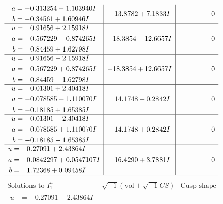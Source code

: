 \documentclass[1p]{elsarticle_modified}
\theoremstyle{definition}
\newcommand{\I}{\sqrt{-1}}
\begin{document}
$$\begin{array}{c|c|c}
\begin{aligned}
a &= -0.313254 - 1.103940 I \\
b &= -0.34561 + 1.60946 I\end{aligned}
 & \phantom{-}13.8782 + 7.1833 I & \phantom{-0.000000 } 0 \\ \hline\begin{aligned}
u &= \phantom{-}0.91656 + 2.15918 I \\
a &= \phantom{-}0.567229 - 0.874265 I \\
b &= \phantom{-}0.84459 + 1.62798 I\end{aligned}
 & -18.3854 - 12.6657 I & \phantom{-0.000000 } 0 \\ \hline\begin{aligned}
u &= \phantom{-}0.91656 - 2.15918 I \\
a &= \phantom{-}0.567229 + 0.874265 I \\
b &= \phantom{-}0.84459 - 1.62798 I\end{aligned}
 & -18.3854 + 12.6657 I & \phantom{-0.000000 } 0 \\ \hline\begin{aligned}
u &= \phantom{-}0.01301 + 2.40418 I \\
a &= -0.078585 - 1.110070 I \\
b &= -0.18185 + 1.65385 I\end{aligned}
 & \phantom{-}14.1748 - 0.2842 I & \phantom{-0.000000 } 0 \\ \hline\begin{aligned}
u &= \phantom{-}0.01301 - 2.40418 I \\
a &= -0.078585 + 1.110070 I \\
b &= -0.18185 - 1.65385 I\end{aligned}
 & \phantom{-}14.1748 + 0.2842 I & \phantom{-0.000000 } 0 \\ \hline\begin{aligned}
u &= -0.27091 + 2.43864 I \\
a &= \phantom{-}0.0842297 + 0.0547107 I \\
b &= \phantom{-}1.72368 + 0.09458 I\end{aligned}
 & \phantom{-}16.4290 + 3.7881 I & \phantom{-0.000000 } 0\\
 \hline 
 \end{array}$$\newpage$$\begin{array}{c|c|c}  
\text{Solutions to }I^u_{1}& \I (\text{vol} + \sqrt{-1}CS) & \text{Cusp shape}\\
 \hline 
\begin{aligned}
u &= -0.27091 - 2.43864 I \\

\end{aligned}
\end{array}$$
\end{document}
